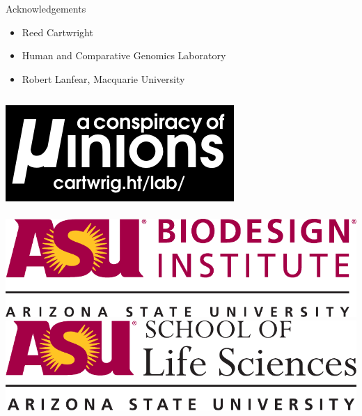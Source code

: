 \documentclass{beamer}
\begin{document}
\begin{frame}{Acknowledgements}
\begin{itemize}
\item Reed Cartwright
\item Human and Comparative Genomics Laboratory
\item Robert Lanfear, Macquarie University
\end{itemize}

\begin{columns}
	\includegraphics[width=.9\linewidth]{figures/lab_logo.pdf}
	\\~\\
	\includegraphics[width=.9\linewidth]{figures/biodesign_logo.pdf}
	\includegraphics[width=.9\linewidth]{figures/sols_logo.pdf}
\end{columns}

\end{frame}

\end{document}
